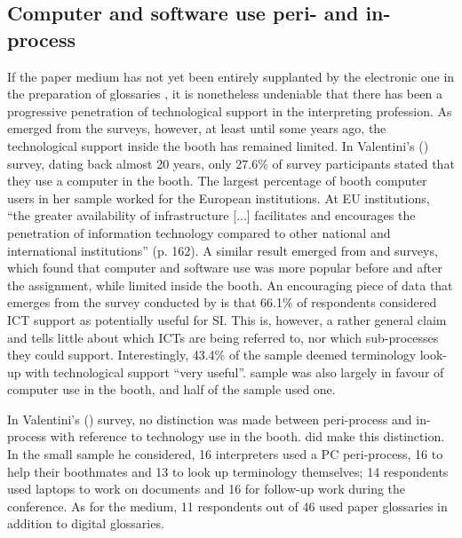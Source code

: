 \subsection{Computer and software use peri- and in-process} \label{pc_during}
If the paper medium has not yet been entirely supplanted by the electronic one in the preparation of glossaries \citep{bilgen_investigating_2009, jiang_interpreters_2013}, it is nonetheless undeniable that there has been a progressive penetration of technological support in the interpreting profession. As emerged from the surveys, however, at least until some years ago, the technological support inside the booth has remained limited. In Valentini's (\citeyear{valentini_uso_2001}) survey, dating back almost 20 years, only 27.6\% of survey participants stated that they use a computer in the booth. The largest percentage of booth computer users in her sample worked for the European institutions. At EU institutions, ``the greater availability of infrastructure [...] facilitates and encourages the penetration of information technology compared to other national and international institutions'' (p. 162). A similar result emerged from  and  surveys, which found that computer and software use was more popular before and after the assignment, while limited inside the booth. An encouraging piece of data that emerges from the survey conducted by \citet{valentini_uso_2001,valentini_uso_2002} is that 66.1\% of respondents considered ICT support as potentially useful for SI. This is, however, a rather general claim and tells little about which ICTs are being referred to, nor which sub-processes they could support. Interestingly, 43.4\% of the sample deemed terminology look-up with technological support ``very useful''.  sample was also largely in favour of computer use in the booth, and half of the sample used one.

In Valentini's (\citeyear{valentini_uso_2001,valentini_uso_2002}) survey, no distinction was made between peri-pro\-cess and in-pro\-cess with reference to technology use in the booth. \citet{drechsel_computereinsatz_2004} did make this distinction. In the small sample he considered, 16 interpreters used a PC peri-process, 16 to help their boothmates and 13 to look up terminology themselves; 14 respondents used laptops to work on documents and 16 for follow-up work during the conference. As for the medium, 11 respondents out of 46 used paper glossaries in addition to digital glossaries.

